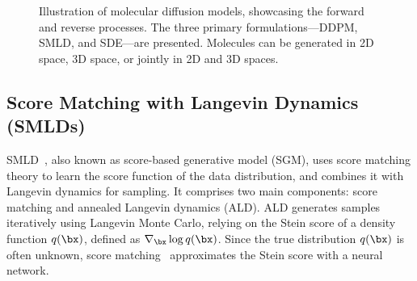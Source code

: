 \begin{figure*}[t]
    \centering
    \caption{Illustration of molecular diffusion models, showcasing the forward and reverse processes. The three primary formulations—DDPM, SMLD, and SDE—are presented. Molecules can be generated in 2D space, 3D space, or jointly in 2D and 3D spaces.} 
    \label{fig:diffusion}
    \vspace{-6pt}
\end{figure*}

\subsection{Score Matching with Langevin Dynamics (SMLDs)}

SMLD~\citep{SMLD}, also known as score-based generative model (SGM), uses score matching theory to learn the score function of the data distribution,
and combines it with Langevin dynamics for sampling. It comprises two main components: score matching and annealed Langevin dynamics (ALD). ALD generates samples iteratively using Langevin Monte Carlo, relying on the Stein score of a density function $q(\bx)$, defined as $\nabla_\bx \log q(\bx)$. Since the true distribution $q(\bx)$ is often unknown, score matching~\citep{ScoreMatching} approximates the Stein score with a neural network.

